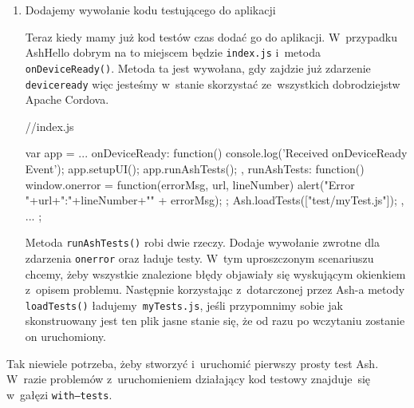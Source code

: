 \documentclass[brudnopis]{xmgr}
\begin{document}
\begin{enumerate}
\begin{javascriptcode}
{      //jesli aplikacja dotarła tutaj,
      //  to zaliczmy ten przypadek testowy
      Ash.endTest();
    });
\end{javascriptcode}

Powyższy kod nie jest bardziej skomplikowany od poprzedniego. Jedyną nowością jest zastosowanie wielu bloków 

\begin{quote}
  \texttt{then(function(){ ... })}
\end{quote}

które są wykonywane jeden po drugim w~kolejności podania i~pozwalają nam łączyć mniejsze funkcje testujace w~bardziej złożone bloki.

 \item Dodajemy wywołanie kodu testującego do aplikacji

Teraz kiedy mamy już kod testów czas dodać go do aplikacji. W~przypadku AshHello dobrym na to miejscem będzie \texttt{index.js} i~metoda \mbox{\texttt{onDeviceReady()}}. Metoda ta jest wywołana, gdy zajdzie już zdarzenie \texttt{deviceready} więc jesteśmy w~stanie skorzystać ze~wszystkich dobrodziejstw Apache Cordova.

 \begin{javascriptcode}
  //index.js
  
  var app = {
	...
    onDeviceReady: function() {
        console.log('Received onDeviceReady Event');
        app.setupUI();
        app.runAshTests();
    },
    runAshTests: function() {
        window.onerror = function(errorMsg, url, lineNumber) {
            alert("Error "+url+":"+lineNumber+"\n" + errorMsg);
        };
        Ash.loadTests(["test/myTest.js"]);
    },
	...
  };

\end{javascriptcode}

Metoda \texttt{runAshTests()} robi dwie rzeczy. Dodaje wywołanie zwrotne dla zdarzenia \texttt{onerror} oraz ładuje testy. W~tym uproszczonym scenariuszu chcemy, żeby wszystkie znalezione błędy objawiały się wyskującym okienkiem z~opisem problemu. Następnie korzystając z~dotarczonej przez Ash-a metody \texttt{loadTests()} ładujemy\texttt{ myTests.js}, jeśli przypomnimy sobie jak skonstruowany jest ten plik jasne stanie się, że od razu po wczytaniu zostanie on uruchomiony. 

\end{enumerate}

Tak niewiele potrzeba, żeby stworzyć i~uruchomić pierwszy prosty test Ash. W~razie problemów z~uruchomieniem działający kod testowy znajduje~się w~gałęzi \texttt{with--tests}.
\end{document}
